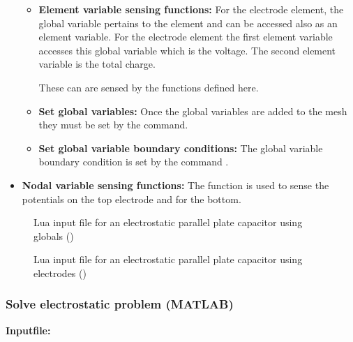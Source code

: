 \begin{itemize}
\begin{itemize}
     \item{\textbf{Element variable sensing functions:}}
     For the electrode element, the global variable pertains
     to the element and can be accessed also as an element 
     variable. For the electrode element the first element 
     variable accesses this global variable which is the 
     voltage. The second element variable is the total charge.

     These can are sensed by the functions defined here.

     \item{\textbf{Set global variables:}}
     Once the global variables are added to the mesh they must
     be set by the  command. 

     \item{\textbf{Set global variable boundary conditions:}}
     The global variable boundary condition is set by the command
     .

  \end{itemize}

  \item{\textbf{Nodal variable sensing functions:}}
  The function  is used to sense the potentials
  on the top electrode and  for the bottom.
 
\end{itemize}

\clearpage
\begin{figure}[htbp]
  {\footnotesize
  }
  \caption{Lua input file for an electrostatic parallel plate
   capacitor using globals ()}
  \label{fig:LuaInputFile:eppc2d_using_globals_sta.lua}
\end{figure}

\begin{figure}[htbp]
  {\footnotesize
  }
  \caption{Lua input file for an electrostatic parallel plate
capacitor using electrodes ()}
  \label{fig:LuaInputFile:eppc2d_using_electrodes_sta.lua}
\end{figure}

\clearpage
\subsubsection*{Solve electrostatic problem (MATLAB)}
\begin{flushleft}
  \textbf{Inputfile:}
  \\
\end{flushleft}
\hspace{1in}
{\footnotesize
{}
}

